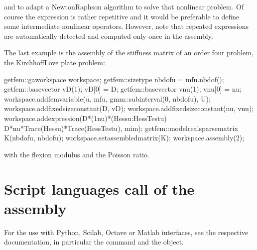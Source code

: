 \documentclass[a4paper,11pt,english]{sphinxmanual}
\begin{document}
and to adapt a Newton\sphinxhyphen{}Raphson algorithm to solve that nonlinear problem. Of course the expression is rather repetitive and it would be preferable to define some intermediate nonlinear operators. However, note that repeated expressions are automatically detected and computed only once in the assembly.

The last example is the assembly of the stiffness matrix of an order four problem, the Kirchhoff\sphinxhyphen{}Love plate problem:

\begin{sphinxVerbatim}[commandchars=\\\{\}]
getfem::ga\PYGZus{}workspace workspace;
getfem::size\PYGZus{}type nbdofu = mf\PYGZus{}u.nb\PYGZus{}dof();
getfem::base\PYGZus{}vector vD(1); vD[0] = D;
getfem::base\PYGZus{}vector vnu(1); vnu[0] = nu;
workspace.add\PYGZus{}fem\PYGZus{}variable(\PYGZdq{}u\PYGZdq{}, mf\PYGZus{}u, gmm::sub\PYGZus{}interval(0, nbdofu), U);
workspace.add\PYGZus{}fixed\PYGZus{}size\PYGZus{}constant(\PYGZdq{}D\PYGZdq{}, vD);
workspace.add\PYGZus{}fixed\PYGZus{}size\PYGZus{}constant(\PYGZdq{}nu\PYGZdq{}, vnu);
workspace.add\PYGZus{}expression(\PYGZdq{}D*(1\PYGZhy{}nu)*(Hess\PYGZus{}u:Hess\PYGZus{}Test\PYGZus{}u) \PYGZhy{}\PYGZdq{}
                         \PYGZdq{}D*nu*Trace(Hess\PYGZus{}u)*Trace(Hess\PYGZus{}Test\PYGZus{}u)\PYGZdq{}, mim);
getfem::model\PYGZus{}real\PYGZus{}sparse\PYGZus{}matrix K(nbdofu, nbdofu);
workspace.set\PYGZus{}assembled\PYGZus{}matrix(K);
workspace.assembly(2);
\end{sphinxVerbatim}

with  the flexion modulus and  the Poisson ratio.


\section{Script languages call of the assembly}
\label{\detokenize{userdoc/gasm_high:script-languages-call-of-the-assembly}}
For the use with Python, Scilab, Octave or Matlab interfaces, see the respective documentation, in particular the  command and the  object.
\end{document}
